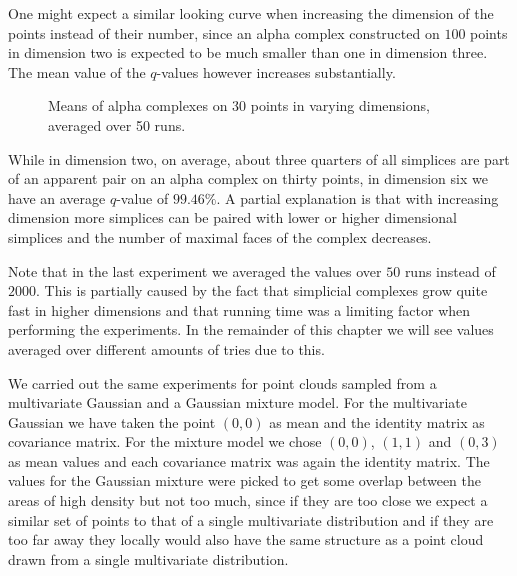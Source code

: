 One might expect a similar looking curve when increasing the dimension of the points instead of their number, since an alpha complex constructed on $100$ points in dimension two is expected to be much smaller than one in dimension three. The mean value of the $q$-values however increases substantially.

\begin{figure}[H]
\begin{subfigure}[c]{0.95\textwidth}
\begin{center}

\end{center}
\end{subfigure}
\caption{Means of alpha complexes on 30 points in varying dimensions, averaged over 50 runs.}
\label{fig:means_by-dimension}
\end{figure}

While in dimension two, on average, about three quarters of all simplices are part of an apparent pair on an alpha complex on thirty points, in dimension six we have an average $q$-value of $99.46 \%$. A partial explanation is that with increasing dimension more simplices can be paired with lower or higher dimensional simplices and the number of maximal faces of the complex decreases. 

Note that in the last experiment we averaged the values over $50$ runs instead of $2000$. This is partially caused by the fact that simplicial complexes grow quite fast in higher dimensions and that running time was a limiting factor when performing the experiments. In the remainder of this chapter we will see values averaged over different amounts of tries due to this.

We carried out the same experiments for point clouds sampled from a multivariate Gaussian and a Gaussian mixture model. For the multivariate Gaussian we have taken the point $(0,0)$ as mean and the identity matrix as covariance matrix. For the mixture model we chose $(0,0)$, $(1,1)$ and $(0,3)$ as mean values and each covariance matrix was again the identity matrix. The values for the Gaussian mixture were picked to get some overlap between the areas of high density but not too much, since if they are too close we expect a similar set of points to that of a single multivariate distribution and if they are too far away they locally would also have the same structure as a point cloud drawn from a single multivariate distribution. 

